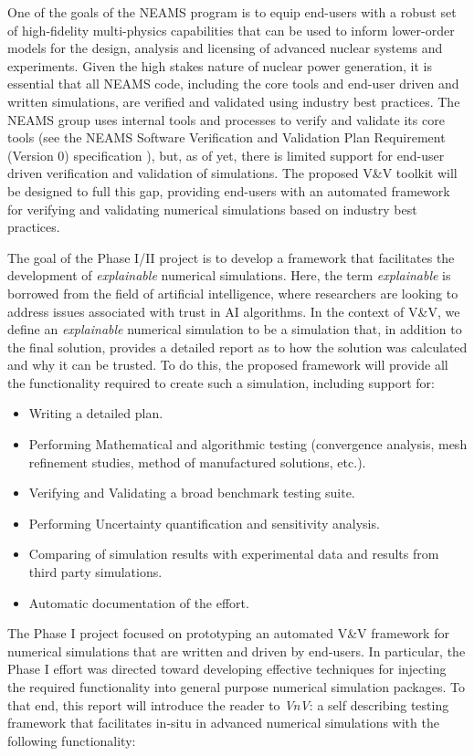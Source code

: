 One of the goals of the NEAMS program is to equip end-users with a robust set of high-fidelity multi-physics capabilities that can be used to inform lower-order models for the design, analysis and licensing of advanced nuclear systems and experiments. Given the high stakes nature of nuclear power generation, it is essential that all NEAMS code, including the core tools and end-user driven and written simulations, are verified and validated using industry best practices. The NEAMS group uses internal tools and processes to verify and validate its core tools (see the NEAMS Software Verification and Validation Plan Requirement (Version 0) specification \cite{NEAMSVV}), but, as of yet, there is limited support for end-user driven verification and validation of simulations. The proposed V\&V toolkit will be designed to full this gap, providing end-users with an automated framework for verifying and validating numerical simulations based on industry best practices.

The goal of the Phase I/II project is to develop a framework that facilitates the development of \emph{explainable} numerical simulations. Here, the term \emph{explainable} is borrowed from the field of artificial intelligence, where researchers are looking to address issues associated with trust in AI algorithms. In the context of V\&V, we define an \emph{explainable} numerical simulation to be a simulation that, in addition to the final solution, provides a detailed report as to how the solution was calculated and why it can be trusted. To do this, the proposed framework will provide all the functionality required to create such a simulation, including support for:

\begin{itemize}
 \item Writing a detailed \VV plan.
 \item Performing Mathematical and algorithmic testing (convergence analysis, mesh refinement studies, method of manufactured solutions, etc.).
 \item Verifying and Validating a broad benchmark testing suite.
 \item Performing Uncertainty quantification and sensitivity analysis.
 \item Comparing of simulation results with experimental data and results from third party simulations. 
 \item Automatic documentation of the \VV effort.
\end{itemize}

The Phase I project focused on prototyping an automated V\&V framework for numerical simulations that are written and driven by end-users. In particular, the Phase I effort was directed toward developing effective techniques for injecting the required functionality into general purpose numerical simulation packages. To that end, this report will introduce the reader to \emph{VnV}: a self describing testing framework that facilitates in-situ \VV in advanced numerical simulations with the following functionality:

